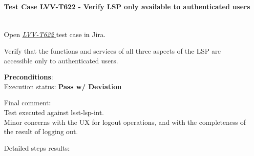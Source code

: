 \documentclass[DM,lsstdraft,STR,toc]{lsstdoc}
\begin{document}
\paragraph{Test Case LVV-T622 - Verify LSP only available to authenticated users
 }\mbox{}\\

Open  \href{https://jira.lsstcorp.org/secure/Tests.jspa#/testCase/LVV-T622}{\textit{ LVV-T622 } }
test case in Jira.

Verify that the functions and services of all three aspects of the LSP
are accessible only to authenticated users.


\textbf{ Preconditions}:\\


Execution status: {\bf Pass w/ Deviation }

Final comment:\\Test executed against lsst-lsp-int. ~\\
Minor concerns with the UX for logout operations, and with the
completeness of the result of logging out.



Detailed steps results:
\end{document}
